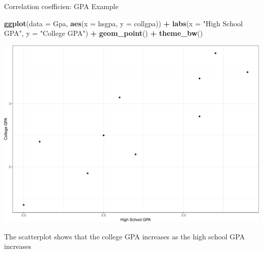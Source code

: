 \documentclass[
  ignorenonframetext,
]{beamer}
\newenvironment{Shaded}{\begin{snugshade}}{\end{snugshade}}
\newcommand{\AttributeTok}[1]{\textcolor[rgb]{0.13,0.29,0.53}{#1}}
\newcommand{\FunctionTok}[1]{\textcolor[rgb]{0.13,0.29,0.53}{\textbf{#1}}}
\newcommand{\NormalTok}[1]{#1}
\newcommand{\SpecialCharTok}[1]{\textcolor[rgb]{0.81,0.36,0.00}{\textbf{#1}}}
\newcommand{\StringTok}[1]{\textcolor[rgb]{0.31,0.60,0.02}{#1}}
\begin{document}
\begin{frame}[fragile]{Correlation coefficien: GPA Example}
\protect\hypertarget{correlation-coefficien-gpa-example-1}{}
\tiny

\begin{Shaded}
\begin{Highlighting}[]
\FunctionTok{ggplot}\NormalTok{(}\AttributeTok{data =}\NormalTok{ Gpa, }\FunctionTok{aes}\NormalTok{(}\AttributeTok{x =}\NormalTok{ hsgpa, }\AttributeTok{y =}\NormalTok{ collgpa)) }\SpecialCharTok{+} 
  \FunctionTok{labs}\NormalTok{(}\AttributeTok{x =} \StringTok{"High School GPA"}\NormalTok{, }\AttributeTok{y =} \StringTok{"College GPA"}\NormalTok{) }\SpecialCharTok{+}
  \FunctionTok{geom\_point}\NormalTok{() }\SpecialCharTok{+} 
  \FunctionTok{theme\_bw}\NormalTok{()}
\end{Highlighting}
\end{Shaded}

\begin{center}\includegraphics[width=0.5\linewidth,height=0.5\textheight]{Week4_files/figure-beamer/unnamed-chunk-9-1} \end{center}
\normalsize

The scatterplot shows that the college GPA increases as the high school
GPA increases
\end{frame}
\end{document}

